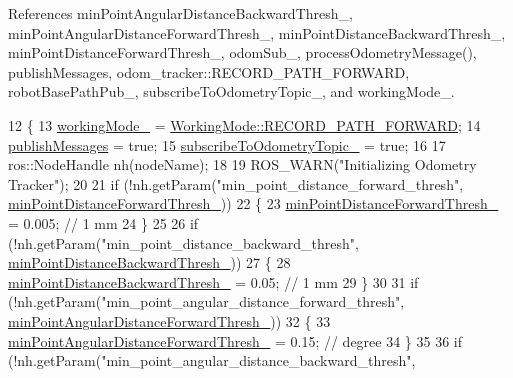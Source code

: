 References min\+Point\+Angular\+Distance\+Backward\+Thresh\+\_\+, min\+Point\+Angular\+Distance\+Forward\+Thresh\+\_\+, min\+Point\+Distance\+Backward\+Thresh\+\_\+, min\+Point\+Distance\+Forward\+Thresh\+\_\+, odom\+Sub\+\_\+, process\+Odometry\+Message(), publish\+Messages, odom\+\_\+tracker\+::\+R\+E\+C\+O\+R\+D\+\_\+\+P\+A\+T\+H\+\_\+\+F\+O\+R\+W\+A\+RD, robot\+Base\+Path\+Pub\+\_\+, subscribe\+To\+Odometry\+Topic\+\_\+, and working\+Mode\+\_\+.


\begin{DoxyCode}
12 \{
13     \hyperlink{classodom__tracker_1_1OdomTracker_ab3b29200405d9a88cf3213656b14d7c0}{workingMode\_} = \hyperlink{namespaceodom__tracker_a4daf27fd157b1a481fdfd6f90de00b88a989d06a586bcf9520889228da7faa643}{WorkingMode::RECORD\_PATH\_FORWARD};
14     \hyperlink{classodom__tracker_1_1OdomTracker_a4d617a7bc17a7880a5ebee9697f827c0}{publishMessages} = \textcolor{keyword}{true};
15     \hyperlink{classodom__tracker_1_1OdomTracker_ae8ddf26c78b4bb30b162d30721d761f6}{subscribeToOdometryTopic\_} = \textcolor{keyword}{true};
16 
17     ros::NodeHandle nh(nodeName);
18 
19     ROS\_WARN(\textcolor{stringliteral}{"Initializing Odometry Tracker"});
20 
21     \textcolor{keywordflow}{if} (!nh.getParam(\textcolor{stringliteral}{"min\_point\_distance\_forward\_thresh"}, 
      \hyperlink{classodom__tracker_1_1OdomTracker_adda207eec9e5a5999e1e97e6f2876377}{minPointDistanceForwardThresh\_}))
22     \{
23         \hyperlink{classodom__tracker_1_1OdomTracker_adda207eec9e5a5999e1e97e6f2876377}{minPointDistanceForwardThresh\_} = 0.005; \textcolor{comment}{// 1 mm}
24     \}
25 
26     \textcolor{keywordflow}{if} (!nh.getParam(\textcolor{stringliteral}{"min\_point\_distance\_backward\_thresh"}, 
      \hyperlink{classodom__tracker_1_1OdomTracker_ae168f975b648874e7f00c2431683b3b1}{minPointDistanceBackwardThresh\_}))
27     \{
28         \hyperlink{classodom__tracker_1_1OdomTracker_ae168f975b648874e7f00c2431683b3b1}{minPointDistanceBackwardThresh\_} = 0.05; \textcolor{comment}{// 1 mm}
29     \}
30 
31     \textcolor{keywordflow}{if} (!nh.getParam(\textcolor{stringliteral}{"min\_point\_angular\_distance\_forward\_thresh"}, 
      \hyperlink{classodom__tracker_1_1OdomTracker_acd2883047a61afe3f574af0995ef7a09}{minPointAngularDistanceForwardThresh\_}))
32     \{
33         \hyperlink{classodom__tracker_1_1OdomTracker_acd2883047a61afe3f574af0995ef7a09}{minPointAngularDistanceForwardThresh\_} = 0.15; \textcolor{comment}{// degree}
34     \}
35 
36     \textcolor{keywordflow}{if} (!nh.getParam(\textcolor{stringliteral}{"min\_point\_angular\_distance\_backward\_thresh"}, 

\end{DoxyCode}
